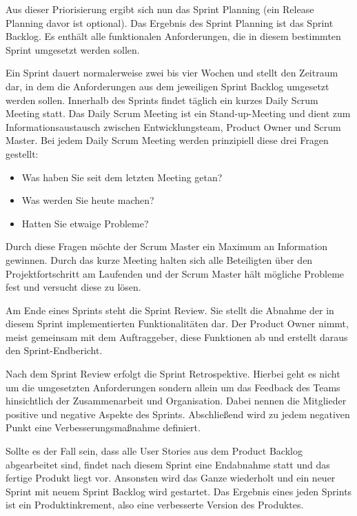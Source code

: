 \newpage

Aus dieser Priorisierung ergibt sich nun das Sprint Planning (ein Release Planning davor ist optional). Das Ergebnis des Sprint Planning ist das Sprint Backlog. Es enthält alle funktionalen Anforderungen, die in diesem bestimmten Sprint umgesetzt werden sollen. \cite{SCRUM}

Ein Sprint dauert normalerweise zwei bis vier Wochen und stellt den Zeitraum dar, in dem die Anforderungen aus dem jeweiligen Sprint Backlog umgesetzt werden sollen. Innerhalb des Sprints findet täglich ein kurzes Daily Scrum Meeting statt. Das Daily Scrum Meeting ist ein Stand-up-Meeting und dient zum Informationsaustausch zwischen Entwicklungsteam, Product Owner und Scrum Master. Bei jedem Daily Scrum Meeting werden prinzipiell diese drei Fragen gestellt:
\begin{itemize}
\item Was haben Sie seit dem letzten Meeting getan?
\item Was werden Sie heute machen?
\item Hatten Sie etwaige Probleme?
\end{itemize}
\cite{SCRUM}

Durch diese Fragen möchte der Scrum Master ein Maximum an Information gewinnen. Durch das kurze Meeting halten sich alle Beteiligten über den Projektfortschritt am Laufenden und der Scrum Master hält mögliche Probleme fest und versucht diese zu lösen.

Am Ende eines Sprints steht die Sprint Review. Sie stellt die Abnahme der in diesem Sprint implementierten Funktionalitäten dar. Der Product Owner nimmt, meist gemeinsam mit dem Auftraggeber, diese Funktionen ab und erstellt daraus den Sprint-Endbericht. \cite{SCRUM}

Nach dem Sprint Review erfolgt die Sprint Retrospektive. Hierbei geht es nicht um die umgesetzten Anforderungen sondern allein um das Feedback des Teams hinsichtlich der Zusammenarbeit und Organisation. Dabei nennen die Mitglieder positive und negative Aspekte des Sprints. Abschließend wird zu jedem negativen Punkt eine Verbesserungsmaßnahme definiert. \cite{SCRUM}

Sollte es der Fall sein, dass alle User Stories aus dem Product Backlog abgearbeitet sind, findet nach diesem Sprint eine Endabnahme statt und das fertige Produkt liegt vor. Ansonsten wird das Ganze wiederholt und ein neuer Sprint mit neuem Sprint Backlog wird gestartet. Das Ergebnis eines jeden Sprints ist ein Produktinkrement, also eine verbesserte Version des Produktes. \cite{SCRUM}

